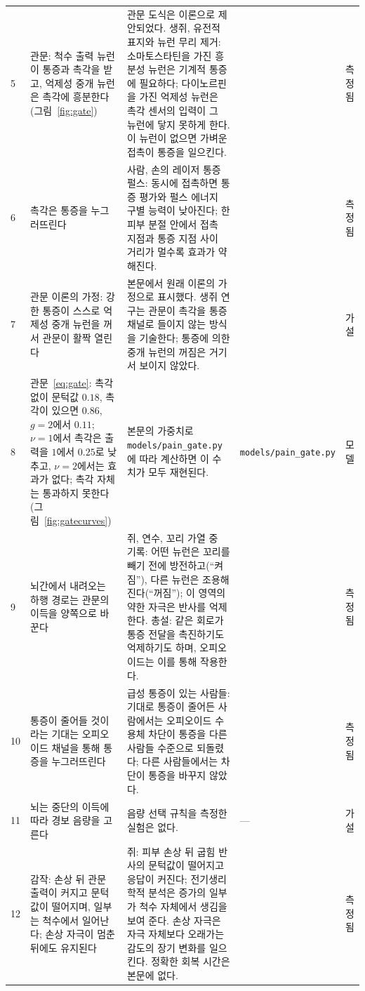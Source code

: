 {\begin{longtable}{>{\raggedright}p{0.5cm}>{\raggedright}p{4.0cm}>{\raggedright}p{5.6cm}>{\raggedright}p{2.3cm}>{\raggedright\arraybackslash}p{1.7cm}}
5 & 관문: 척수 출력 뉴런이 통증과 촉각을 받고, 억제성 중개 뉴런은 촉각에 흥분한다(그림~\ref{fig:gate}) & 관문 도식은 이론으로 제안되었다. 생쥐, 유전적 표지와 뉴런 무리 제거: 소마토스타틴을 가진 흥분성 뉴런은 기계적 통증에 필요하다; 다이노르핀을 가진 억제성 뉴런은 촉각 센서의 입력이 그 뉴런에 닿지 못하게 한다. 이 뉴런이 없으면 가벼운 접촉이 통증을 일으킨다. & \cite{MelzackWall1965, Duan2014} & 측정됨 \\
6 & 촉각은 통증을 누그러뜨린다 & 사람, 손의 레이저 통증 펄스: 동시에 접촉하면 통증 평가와 펄스 에너지 구별 능력이 낮아진다; 한 피부 분절 안에서 접촉 지점과 통증 지점 사이 거리가 멀수록 효과가 약해진다. & \cite{Mancini2014touch} & 측정됨 \\
7 & 관문 이론의 가정: 강한 통증이 스스로 억제성 중개 뉴런을 꺼서 관문이 활짝 열린다 & 본문에서 원래 이론의 가정으로 표시했다. 생쥐 연구는 관문이 촉각을 통증 채널로 들이지 않는 방식을 기술한다; 통증에 의한 중개 뉴런의 꺼짐은 거기서 보이지 않았다. & \cite{MelzackWall1965} & 가설 \\
8 & 관문~\eqref{eq:gate}: 촉각 없이 문턱값 $0.18$, 촉각이 있으면 $0.86$, $g=2$에서 $0.11$; $\nu=1$에서 촉각은 출력을 $1$에서 $0.25$로 낮추고, $\nu=2$에서는 효과가 없다; 촉각 자체는 통과하지 못한다(그림~\ref{fig:gatecurves}) & 본문의 가중치로 \texttt{models/\allowbreak pain\_\allowbreak gate.py}에 따라 계산하면 이 수치가 모두 재현된다. & \texttt{models/\allowbreak pain\_\allowbreak gate.py} & 모델 \\
9 & 뇌간에서 내려오는 하행 경로는 관문의 이득을 양쪽으로 바꾼다 & 쥐, 연수, 꼬리 가열 중 기록: 어떤 뉴런은 꼬리를 빼기 전에 방전하고(“켜짐”), 다른 뉴런은 조용해진다(“꺼짐”); 이 영역의 약한 자극은 반사를 억제한다. 총설: 같은 회로가 통증 전달을 촉진하기도 억제하기도 하며, 오피오이드는 이를 통해 작용한다. & \cite{Fields1983rvm, Fields2004} & 측정됨 \\
10 & 통증이 줄어들 것이라는 기대는 오피오이드 채널을 통해 통증을 누그러뜨린다 & 급성 통증이 있는 사람들: 기대로 통증이 줄어든 사람에서는 오피오이드 수용체 차단이 통증을 다른 사람들 수준으로 되돌렸다; 다른 사람들에서는 차단이 통증을 바꾸지 않았다. & \cite{Levine1978} & 측정됨 \\
11 & 뇌는 중단의 이득에 따라 경보 음량을 고른다 & 음량 선택 규칙을 측정한 실험은 없다. & --- & 가설 \\
12 & 감작: 손상 뒤 관문 출력이 커지고 문턱값이 떨어지며, 일부는 척수에서 일어난다; 손상 자극이 멈춘 뒤에도 유지된다 & 쥐: 피부 손상 뒤 굽힘 반사의 문턱값이 떨어지고 응답이 커진다; 전기생리학적 분석은 증가의 일부가 척수 자체에서 생김을 보여 준다. 손상 자극은 자극 자체보다 오래가는 감도의 장기 변화를 일으킨다. 정확한 회복 시간은 본문에 없다. & \cite{Woolf1983} & 측정됨 \\

\end{longtable}}
